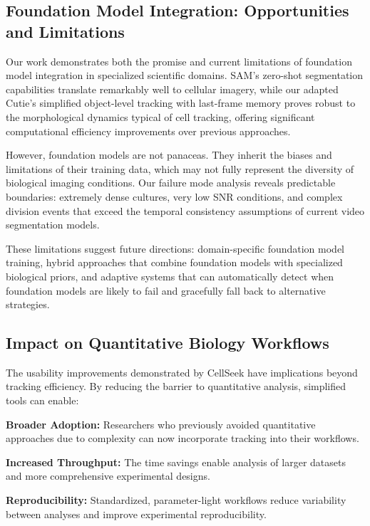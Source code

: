 \documentclass[../cellseek_paper.tex]{subfiles}
\begin{document}
\subsection{Foundation Model Integration: Opportunities and Limitations}

Our work demonstrates both the promise and current limitations of foundation model integration in specialized scientific domains. SAM's zero-shot segmentation capabilities translate remarkably well to cellular imagery, while our adapted Cutie's simplified object-level tracking with last-frame memory proves robust to the morphological dynamics typical of cell tracking, offering significant computational efficiency improvements over previous approaches.

However, foundation models are not panaceas. They inherit the biases and limitations of their training data, which may not fully represent the diversity of biological imaging conditions. Our failure mode analysis reveals predictable boundaries: extremely dense cultures, very low SNR conditions, and complex division events that exceed the temporal consistency assumptions of current video segmentation models.

These limitations suggest future directions: domain-specific foundation model training, hybrid approaches that combine foundation models with specialized biological priors, and adaptive systems that can automatically detect when foundation models are likely to fail and gracefully fall back to alternative strategies.

\subsection{Impact on Quantitative Biology Workflows}

The usability improvements demonstrated by CellSeek have implications beyond tracking efficiency. By reducing the barrier to quantitative analysis, simplified tools can enable:

\textbf{Broader Adoption:} Researchers who previously avoided quantitative approaches due to complexity can now incorporate tracking into their workflows.

\textbf{Increased Throughput:} The time savings enable analysis of larger datasets and more comprehensive experimental designs.

\textbf{Reproducibility:} Standardized, parameter-light workflows reduce variability between analyses and improve experimental reproducibility.
\end{document}
